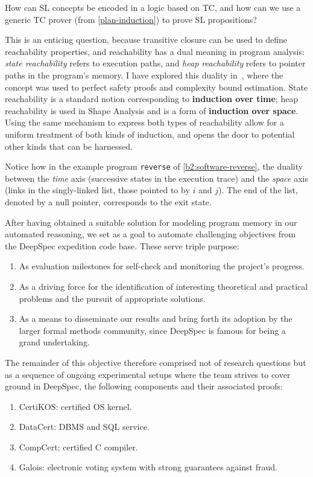 \begin{researchquestion}
How can SL concepts be encoded in a logic based on TC,
and how can we use a generic TC prover (from \autoref{plan-induction})
to prove SL propositions?
\end{researchquestion}

This is an enticing question, because transitive closure can be used to define reachability properties,
and reachability has a dual meaning in program analysis: \emph{state reachability} refers to execution paths,
and \emph{heap reachability} refers to pointer paths in the program's memory.
I have explored this duality in~\cite{ESOP2021:Ish-Shalom},
where the concept was used to perfect safety proofs and complexity bound estimation.
State reachability is a standard notion corresponding to \textbf{induction over time};
heap reachability is used in Shape Analysis and is a form of \textbf{induction over space}.
Using the same mechanism to express both types of reachability allow for a uniform treatment of both kinds of induction, and opens the door to potential other kinds that can be harnessed.

Notice how in the example program \texttt{reverse}
of \autoref{b2:software-reverse},
the duality between the \emph{time} axis (successive states in the execution trace) and the \emph{space}
axis (links in the singly-linked list, \esp those pointed to by $i$ and $j$).
The end of the list, denoted by a null pointer,
corresponds to the exit state.

\smallskip
After having obtained a suitable solution for modeling program memory in our automated reasoning,
we set as a goal to automate challenging objectives from the DeepSpec expedition code base.
These serve triple purpose:
\begin{enumerate}
  \item As evaluation milestones for self-check and monitoring the project's progress.
  \item As a driving force for the identification of interesting theoretical and practical problems and the pursuit of appropriate solutions.
  \item As a means to disseminate our results and bring forth its adoption by the larger formal methods community, since DeepSpec is famous for being a grand undertaking.
\end{enumerate}

The remainder of this objective therefore comprised not of research questions but as a sequence of ongoing experimental setups where the team strives to cover ground in DeepSpec, \esp the following components and their associated proofs:
\begin{enumerate}
  \item CertiKOS: certified OS kernel.
  \item DataCert: DBMS and SQL service.
  \item CompCert: certified C compiler.
  \item Galois: electronic voting system with strong guarantees against fraud.
\end{enumerate}

